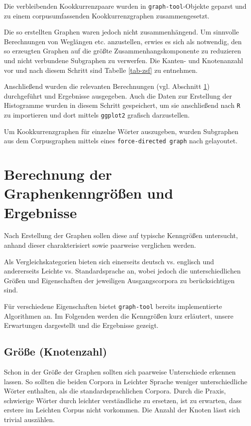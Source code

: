 \documentclass[11pt, a4paper]{article}
\begin{document}
Die verbleibenden Kookkurrenzpaare wurden in \texttt{graph-tool}-Objekte geparst
und zu einem corpusumfassenden Kookkurrenzgraphen zusammengesetzt.

Die so erstellten Graphen waren jedoch nicht zusammenhängend.
Um sinnvolle Berechnungen von Weglängen etc. anzustellen, erwies es sich als
notwendig, den so erzeugten Graphen auf die größte Zusammenhangskomponente zu
reduzieren und nicht verbundene Subgraphen zu verwerfen.
Die Kanten- und Knotenanzahl vor und nach diesem Schritt sind Tabelle
\ref{tab-zsf} zu entnehmen.

Anschließend wurden die relevanten Berechnungen (vgl. Abschnitt
\ref{sec:berechnung-ergebnisse}) durchgeführt und Ergebnisse ausgegeben.
Auch die Daten zur Erstellung der Histogramme wurden in diesem Schritt
gespeichert, um sie anschließend nach \texttt{R} zu importieren und dort mittels
\texttt{ggplot2} grafisch darzustellen.

Um Kookkurrenzgraphen für einzelne Wörter auszugeben, wurden Subgraphen aus dem
Corpusgraphen mittels eines \texttt{force-directed graph} nach
\cite{Hu2006} gelayoutet.


\section{Berechnung der Graphenkenngr\"o\ss{}en und Ergebnisse}
\label{sec:berechnung-ergebnisse}

Nach Erstellung der Graphen sollen diese auf typische Kenngrößen untersucht,
anhand dieser charakterisiert sowie paarweise verglichen werden.

Als Vergleichskategorien bieten sich einerseits deutsch vs. englisch und andererseits Leichte vs.
Standardsprache an, wobei jedoch die unterschiedlichen Größen und Eigenschaften der
jeweiligen Ausgangscorpora zu berücksichtigen sind.

Für verschiedene Eigenschaften bietet \texttt{graph-tool} bereits implementierte
Algorithmen an. Im Folgenden werden die Kenngrößen kurz erläutert, unsere
Erwartungen dargestellt und die Ergebnisse gezeigt.


\subsection{Gr\"o\ss{}e (Knotenzahl)}
\label{groesse-knotenzahl}

Schon in der Größe der Graphen sollten sich paarweise Unterschiede erkennen
lassen. So sollten die beiden Corpora in Leichter Sprache weniger
unterschiedliche Wörter enthalten, als die standardsprachlichen Corpora.
Durch die Praxis, schwierige Wörter
durch leichter verständliche zu ersetzen, ist zu erwarten, dass erstere im
Leichten Corpus nicht vorkommen. Die Anzahl der Knoten lässt sich trivial
auszählen.
\end{document}
